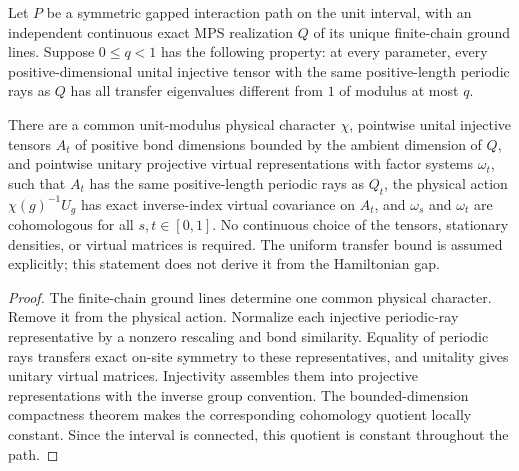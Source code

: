 \begin{lemma}
    \label{thm:spc_aux_exact_ground_uniform_transfer_class}
    \leanok
    Let $P$ be a symmetric gapped interaction path on the unit interval,
    with an independent continuous exact MPS realization $Q$ of its unique
    finite-chain ground lines. Suppose $0\le q<1$ has the following property:
    at every parameter, every positive-dimensional unital injective tensor
    with the same positive-length periodic rays as $Q$ has all transfer
    eigenvalues different from $1$ of modulus at most $q$.

    There are a common unit-modulus physical character $\chi$, pointwise
    unital injective tensors $A_t$ of positive bond dimensions bounded by the
    ambient dimension of $Q$, and pointwise unitary projective virtual
    representations with factor systems $\omega_t$, such that $A_t$ has the
    same positive-length periodic rays as $Q_t$, the physical action
    $\chi(g)^{-1}U_g$ has exact inverse-index virtual covariance on $A_t$,
    and $\omega_s$ and $\omega_t$ are cohomologous for all $s,t\in[0,1]$.
    No continuous choice of the tensors, stationary densities, or virtual
    matrices is required. The uniform transfer bound is assumed explicitly;
    this statement does not derive it from the Hamiltonian gap.
\end{lemma}

\begin{proof}\leanok
    The finite-chain ground lines determine one common physical character.
    Remove it from the physical action. Normalize each injective periodic-ray
    representative by a nonzero rescaling and bond similarity. Equality of
    periodic rays transfers exact on-site symmetry to these representatives,
    and unitality gives unitary virtual matrices. Injectivity assembles them
    into projective representations with the inverse group convention.
    The bounded-dimension compactness theorem makes the corresponding
    cohomology quotient locally constant. Since the interval is connected,
    this quotient is constant throughout the path.
\end{proof}

